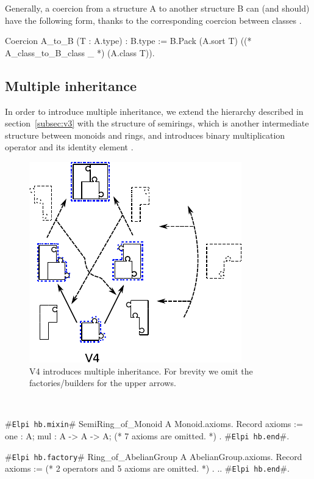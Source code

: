 \documentclass[a4paper,UKenglish,cleveref, autoref]{lipics-v2019}
\newcommand{\hbmixin}{{\tt\color{dkgreen}Elpi hb.mixin}}
\newcommand{\hbfactory}{{\tt\color{dkgreen}Elpi hb.factory}}
\newcommand{\hbend}{{\tt\color{dkgreen}Elpi hb.end}}
\theoremstyle{implem}
\theoremstyle{implem}
\theoremstyle{command}
\begin{document}
Generally, a coercion from a structure A to another structure B can (and should) have the following form, thanks to the corresponding coercion between classes .
\begin{coqcode}
Coercion A_to_B (T : A.type) : B.type :=
  B.Pack (A.sort T) ((* A_class_to_B_class _ *) (A.class T)).
\end{coqcode}

\subsection{Multiple inheritance}
In order to introduce multiple inheritance, we extend the hierarchy described in
section~\ref{subsec:v3} with the structure of semirings, which is another
intermediate structure between monoids and rings, and introduces binary
multiplication operator  and its identity element .

\begin{figure}
 \includegraphics[width=.4\textwidth]{v4.pdf}
 \caption{V4 introduces multiple inheritance. For brevity we omit the factories/builders for the upper arrows.}
 \label{fig:puzzle}
\end{figure}
\ 
\begin{coqcode}
#\hbmixin{}# SemiRing_of_Monoid A Monoid.axioms.
  Record axioms := {
    one : A;
    mul : A -> A -> A;
    (* 7 axioms are omitted. *)
  }.
#\hbend{}#.

#\hbfactory{}# Ring_of_AbelianGroup A
    AbelianGroup.axioms.
  Record axioms := {
    (* 2 operators and 5 axioms are omitted. *)
  }.
  ..
#\hbend{}#.
\end{coqcode}
\end{document}
